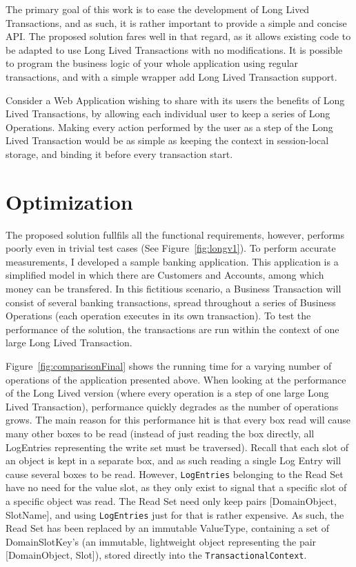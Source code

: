 \documentclass{llncs}
\begin{document}
The primary goal of this work is to ease the development of Long Lived
Transactions, and as such, it is rather important to provide a simple
and concise API. The proposed solution fares well in that regard, as
it allows existing code to be adapted to use Long Lived Transactions
with no modifications. It is possible to program the business logic of
your whole application using regular transactions, and with a simple
wrapper add Long Lived Transaction support.

Consider a Web Application wishing to share with its users the
benefits of Long Lived Transactions, by allowing each individual user
to keep a series of Long Operations. Making every action performed by
the user as a step of the Long Lived Transaction would be as simple as
keeping the context in session-local storage, and binding it before
every transaction start.



\section{Optimization}

The proposed solution fullfils all the functional requirements,
however, performs poorly even in trivial test cases (See
Figure~\ref{fig:longv1}). To perform accurate measurements, I
developed a sample banking application. This application is a
simplified model in which there are Customers and Accounts, among
which money can be transfered. In this fictitious scenario, a Business
Transaction will consist of several banking transactions, spread
throughout a series of Business Operations (each operation executes in
its own transaction). To test the performance of the solution, the
transactions are run within the context of one large Long Lived
Transaction.

Figure~\ref{fig:comparisonFinal} shows the running time for a varying
number of operations of the application presented above.  When looking
at the performance of the Long Lived version (where every operation is
a step of one large Long Lived Transaction), performance quickly
degrades as the number of operations grows. The main reason for this
performance hit is that every box read will cause many other boxes to
be read (instead of just reading the box directly, all LogEntries
representing the write set must be traversed). Recall that each slot
of an object is kept in a separate box, and as such reading a single
Log Entry will cause several boxes to be read. However,
\texttt{LogEntries} belonging to the Read Set have no need for the
value slot, as they only exist to signal that a specific slot of a
specific object was read. The Read Set need only keep pairs
[DomainObject, SlotName], and using \texttt{LogEntries} just for that
is rather expensive. As such, the Read Set has been replaced by an
immutable ValueType, containing a set of DomainSlotKey's (an
immutable, lightweight object representing the pair [DomainObject,
Slot]), stored directly into the \texttt{TransactionalContext}.
\end{document}
